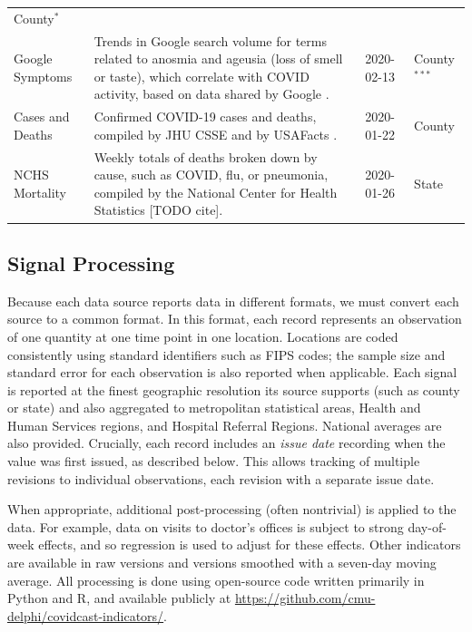 \documentclass[9pt,twocolumn,twoside,lineno]{pnas-new}
\begin{document}
\begin{table}[t]
\begin{tabular}{>{\raggedright}p{1.2in} p{4.0in} l >{\raggedright\arraybackslash}p{0.5in}}
County$^*$ \\
    Google Symptoms & Trends in Google search volume for terms related to
anosmia and ageusia (loss of smell or taste), which correlate with COVID
activity, based on data shared by Google \cite{GoogleSymptoms}. & 2020-02-13 &
County$^{***}$ \\
    Cases and Deaths & Confirmed COVID-19 cases and deaths, compiled by JHU CSSE 
\cite{Dong:2020} and by USAFacts \cite{USAFacts}. & 2020-01-22 & County \\
    NCHS Mortality & Weekly totals of deaths broken down by cause, such as
COVID, flu, or pneumonia, compiled by the National Center for Health Statistics
[TODO cite]. & 2020-01-26 & State \\
    \bottomrule
  \end{tabular}
  \label{tab:sources_signals}
\end{table}

\subsection{Signal Processing}

Because each data source reports data in different formats, we must convert each
source to a common format. In this format, each record represents an observation
of one quantity at one time point in one location. Locations are coded
consistently using standard identifiers such as FIPS codes; the sample size and
standard error for each observation is also reported when applicable. Each
signal is reported at the finest geographic resolution its source supports (such
as county or state) and also aggregated to metropolitan statistical areas,
Health and Human Services regions, and Hospital Referral Regions. National
averages are also provided. Crucially, each record includes an \textit{issue
  date} recording when the value was first issued, as described below. This
allows tracking of multiple revisions to individual observations, each revision
with a separate issue date.

When appropriate, additional post-processing (often nontrivial) is applied to
the data. For example, data on visits to doctor's offices is subject to strong
day-of-week effects, and so regression is used to adjust for these
effects. Other indicators are available in raw versions and versions smoothed
with a seven-day moving average. All processing is done using open-source code
written primarily in Python and R, and available publicly at
\url{https://github.com/cmu-delphi/covidcast-indicators/}.
\end{document}
